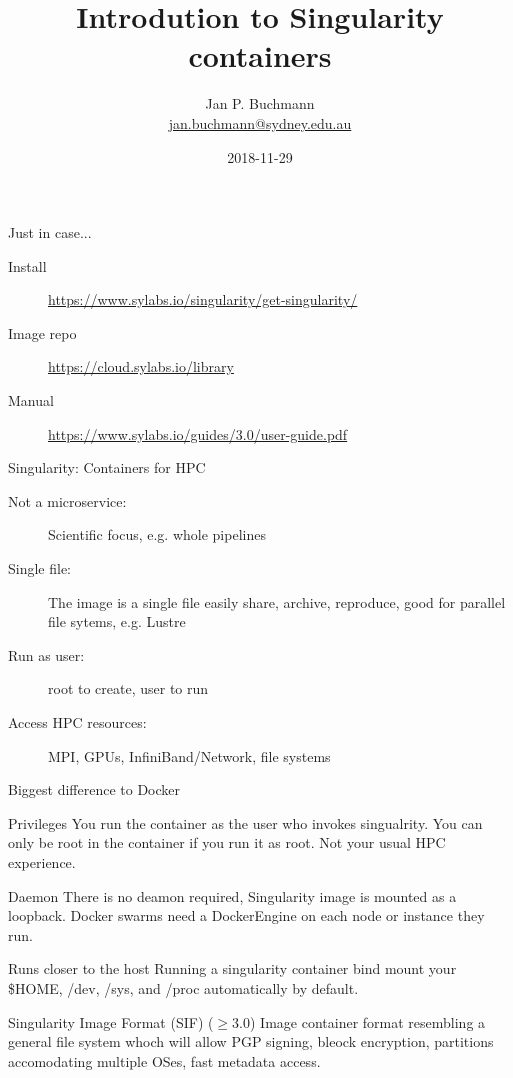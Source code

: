 \documentclass{beamer}
\title[]{Introdution to Singularity containers}
\subtitle{}
\author[]{Jan P. Buchmann\\\small{\href{mailto:jan.buchmann@sydney.edu.au}{jan.buchmann@sydney.edu.au}}}
\institute{The University Of Sydney}
\date{2018-11-29}
\begin{document}
  \titlepage

  \begin{frame}{Just in case...}
    \begin{description}
      \item[Install] \url{https://www.sylabs.io/singularity/get-singularity/}
      \item[Image repo] \url{https://cloud.sylabs.io/library}
      \item[Manual] \url{https://www.sylabs.io/guides/3.0/user-guide.pdf}
    \end{description}
  \end{frame}

  \begin{frame}{Singularity: Containers for HPC}
    \begin{description}
      \item[Not a microservice:]Scientific focus, e.g. whole pipelines
      \item[Single file:] The image is a single file easily share, archive,
                          reproduce, good for parallel file sytems, e.g. Lustre
      \item[Run as user:] root to create, user to run
      \item[Access HPC resources:] MPI, GPUs, InfiniBand/Network, file systems
    \end{description}
  \end{frame}


  \begin{frame}{Biggest difference to Docker}
    \begin{block}{Privileges}
      You run the container as the user who invokes singualrity. You can only
      be root in the container if you run it as root. Not your usual HPC
      experience.
    \end{block}
    \begin{block}{Daemon}
      There is no deamon required, Singularity image is mounted as a loopback.
      Docker swarms need a DockerEngine on each  node or instance they run.
    \end{block}
    \begin{block}{Runs closer to the host}
      Running a singularity container bind mount your \$HOME, /dev, /sys, and
      /proc automatically by default.
    \end{block}
    \begin{block}{Singularity Image Format (SIF) ($\geq$3.0)}
      Image container format resembling a general file system whoch will allow
      PGP signing, bleock encryption, partitions accomodating multiple OSes,
      fast metadata access.
    \end{block}
  \end{frame}
\end{document}
